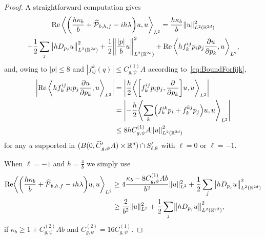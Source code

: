 \documentclass[10pt]{amsart}
\theoremstyle{definition}\newtheorem{defi}[theo]{Definition}\newtheorem{rema}[theo]{Remark}\newtheorem{exam}[theo]{Example}\newtheorem{exem}[theo]{Example}\newtheorem{nota}[theo]{Notation}
\newcommand{\R}{\mathbb{R}}
\newcommand{\clP}{\mathcal{P}}
\DeclareMathOperator{\Ree}{Re}
\newcommand\norm[1]{\left\lVert#1\right\rVert}
\let\oldhat\hat
\renewcommand*{\hat}[1]{\mathchoice{\widehat{#1}}{\widehat{#1}}{\oldhat{#1}}{\oldhat{#1}}}
\let\originalleft\left
\let\originalright\right
\renewcommand{\left}{\mathopen{}\mathclose\bgroup\originalleft}
\renewcommand{\right}{\aftergroup\egroup\originalright}
\begin{document}
\begin{proof}
A straightforward computation gives
\begin{multline}\label{eq:straightfor}
\Ree\, \left\langle \left(\frac{h\kappa_b}{b} + \hat{\clP}_{b,h,f}-i h\lambda \right) u, u \right\rangle_{L^2}
= \frac{h\kappa_b}{b} \|u\|_{L^2(\R^{2d})}^2 \\+ \frac{1}{2} \sum_j \left\| hD_{p_j} u \right\|_{L^2(\R^{2d})}^2
 + \frac{1}{2}\left\| \frac{|p|}{b} u \right\|_{L^2(\R^{2d})}^2 
+ \Ree\, \left\langle hf^{ij}_k p_ip_j \frac{\partial u} {\partial p_k},u \right\rangle_{L^2},
\end{multline}
and, owing to $|p|\leq 8$ and $|f_{ij}^{k}(q)|\leq C_{g,\psi}^{(1)}A$ according to~\eqref{eq:BoundForfijk},
\begin{equation}\label{equality:fErrorTerm}
\begin{aligned}[t]
\left|\Ree\, \left\langle hf^{ij}_k p_ip_j \frac{\partial u}{\partial p_k},u \right\rangle_{L^2}\right| &= \left|\frac{h}{2}
\left\langle
\left[f^{ij}_{k}p_{i}p_{j},\frac{\partial}{\partial p_{k}} \right]u, u \right\rangle_{L^2}\right|\\
&= \left|-\frac{h}{2}
\left\langle
\sum_k\left(f^{ik}_{k}p_{i}+f^{kj}_{k}p_{j}
\right)u, u
\right\rangle_{L^2}\right|
\\
&\leq 8h C_{g,\psi}^{(1)} A\norm{u}_{L^2(\R^{2d})}^2
\end{aligned}
\end{equation}
for any $u$ supported in $(B(0,\hat{C}'_{g,\psi}A)\times \R^d)\cap S_{\ell,8}'$ with $\ell=0$ or $\ell=-1$.

When $\ell=-1$ and $h=\frac{4}{b}$ we simply use
\begin{align*}
\Ree \left\langle \left(\frac{h\kappa_b}{b} + \hat{\clP}_{b,h,f}-i h\lambda \right) u, u \right\rangle_{L^2} &
\geq 4\frac{\kappa_b-8C_{g,\psi}^{(1)}Ab}{b^2} \|u\|_{L^2}^2 + \frac{1}{2} \sum_j \left\| hD_{p_j} u \right\|_{L^2(\R^{2d})}^2
\\
&\geq \frac{2}{b^2}\|u\|_{L^2}^2 + \frac{1}{2} \sum_j \left\| hD_{p_j} u \right\|_{L^2(\R^{2d})}^2,
\end{align*}
if $\kappa_b\geq 1+C_{g,\psi}^{(2)}Ab$ and $C_{g,\psi}^{(2)}=16C_{g,\psi}^{(1)}$.


\end{proof}
\end{document}
